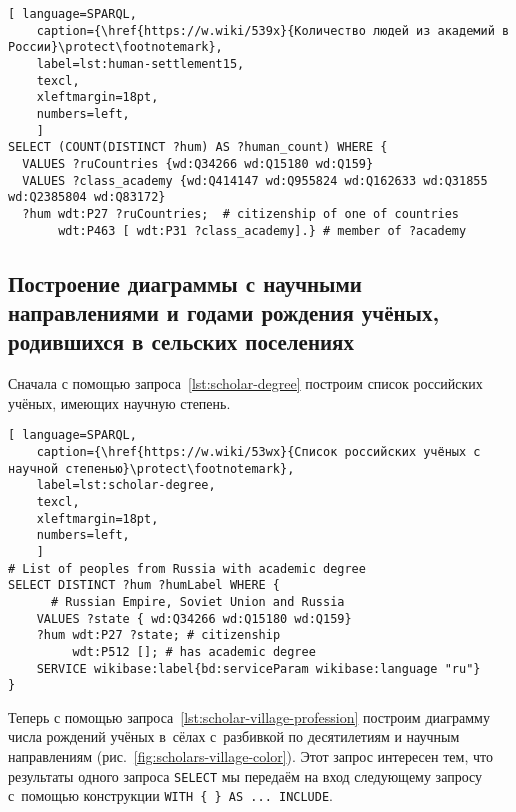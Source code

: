 \begin{lstlisting}[ language=SPARQL, 
    caption={\href{https://w.wiki/539x}{Количество людей из академий в России}\protect\footnotemark},
    label=lst:human-settlement15,
    texcl,
    xleftmargin=18pt, 
    numbers=left,
    ]
SELECT (COUNT(DISTINCT ?hum) AS ?human_count) WHERE {
  VALUES ?ruCountries {wd:Q34266 wd:Q15180 wd:Q159}
  VALUES ?class_academy {wd:Q414147 wd:Q955824 wd:Q162633 wd:Q31855 wd:Q2385804 wd:Q83172}
  ?hum wdt:P27 ?ruCountries;  # citizenship of one of countries
       wdt:P463 [ wdt:P31 ?class_academy].} # member of ?academy
\end{lstlisting}%





\subsection{Построение диаграммы с научными направлениями 
и годами рождения учёных, \mbox{родившихся} в сельских поселениях}

Сначала с помощью запроса~\ref{lst:scholar-degree} 
построим список российских учёных, имеющих научную степень.

\begin{lstlisting}[ language=SPARQL, 
    caption={\href{https://w.wiki/53wx}{Список российских учёных с научной степенью}\protect\footnotemark},
    label=lst:scholar-degree,
    texcl,
    xleftmargin=18pt, 
    numbers=left,
    ]
# List of peoples from Russia with academic degree
SELECT DISTINCT ?hum ?humLabel WHERE {
      # Russian Empire, Soviet Union and Russia
    VALUES ?state { wd:Q34266 wd:Q15180 wd:Q159}
    ?hum wdt:P27 ?state; # citizenship
         wdt:P512 []; # has academic degree 
    SERVICE wikibase:label{bd:serviceParam wikibase:language "ru"}
}
\end{lstlisting}%



Теперь с помощью запроса~\ref{lst:scholar-village-profession} 
построим диаграмму числа рождений учёных в~сёлах с~разбивкой по десятилетиям %
и научным направлениям (рис.~\ref{fig:scholars-village-color}). 
Этот запрос интересен тем, что результаты одного запроса \lstinline|SELECT| 
мы передаём на вход следующему запросу с~помощью конструкции \lstinline|WITH { } AS ... INCLUDE|. 

